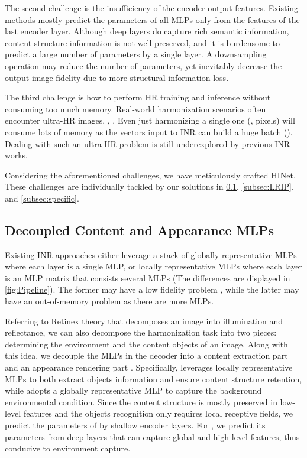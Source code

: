 \documentclass[10pt,journal,twocolumn,twoside]{IEEEtran}
\begin{document}
The second challenge is the insufficiency of the encoder output features. Existing methods mostly predict the parameters of all MLPs only from the features of the last encoder layer. Although deep layers do capture rich semantic information, content structure information is not well preserved, and it is burdensome to predict a large number of parameters by a single layer. A downsampling operation may reduce the number of parameters, yet inevitably decrease the output image fidelity due to more structural information loss.

The third challenge is how to perform HR training and inference without consuming too much memory. Real-world harmonization scenarios often encounter ultra-HR images, \eg, . Even just harmonizing a single one (\eg,  pixels) will consume lots of memory as the vectors input to INR can build a huge batch (). Dealing with such an ultra-HR problem is still underexplored by previous INR works.

Considering the aforementioned challenges, we have meticulously crafted HINet. These challenges are individually tackled by our solutions in \cref{subsec:decoupled}, \cref{subsec:LRIP}, and \cref{subsec:specific}.


\subsection{Decoupled Content and Appearance MLPs}
\label{subsec:decoupled}

Existing INR approaches either leverage a stack of globally representative MLPs \cite{skorokhodov2021adversarial, anokhin2021image} where each layer is a single MLP, or locally representative MLPs \cite{shaham2021spatially} where each layer is an MLP matrix that consists several MLPs (The differences are displayed in \cref{fig:Pipeline}). The former may have a low fidelity problem \cite{sitzmann2020implicit}, while the latter may have an out-of-memory problem as there are more MLPs.

Referring to Retinex theory \cite{land1971lightness, land1977retinex} that decomposes an image into illumination and reflectance, we can also decompose the harmonization task into two pieces: determining the environment and the content objects of an image. Along with this idea, we decouple the MLPs in the decoder into a content extraction part  and an appearance rendering part . Specifically,  leverages locally representative MLPs to both extract objects information and ensure content structure retention, while  adopts a globally representative MLP to capture the background environmental condition. Since the content structure is mostly preserved in low-level features and the objects recognition only requires local receptive fields, we predict the parameters of  by shallow encoder layers. For , we predict its parameters from deep layers that can capture global and high-level features, thus conducive to environment capture.
\end{document}
